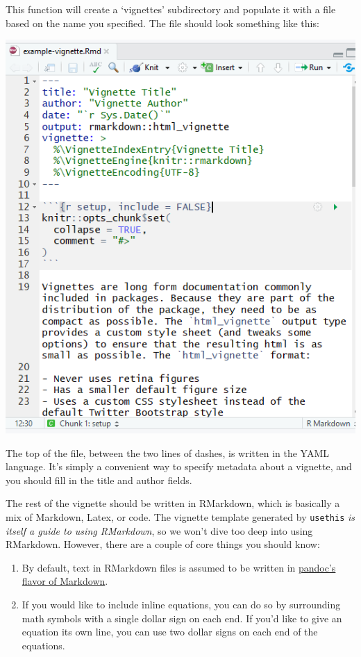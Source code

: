 \documentclass[
]{book}
\providecommand{\tightlist}{%
  \setlength{\itemsep}{0pt}\setlength{\parskip}{0pt}}
\begin{document}
This function will create a `vignettes' subdirectory and populate it with a file based on the name you specified. The file should look something like this:

\includegraphics{images/packageSS/vignette1.PNG}

The top of the file, between the two lines of dashes, is written in the YAML language. It's simply a convenient way to specify metadata about a vignette, and you should fill in the title and author fields.

The rest of the vignette should be written in RMarkdown, which is basically a mix of Markdown, Latex, or code. The vignette template generated by \texttt{usethis} \emph{is itself a guide to using RMarkdown}, so we won't dive too deep into using RMarkdown. However, there are a couple of core things you should know:

\begin{enumerate}
\def\labelenumi{\arabic{enumi}.}
\tightlist
\item
  By default, text in RMarkdown files is assumed to be written in \href{http://pandoc.org/MANUAL.html}{pandoc's flavor of Markdown}.
\item
  If you would like to include inline equations, you can do so by surrounding math symbols with a single dollar sign on each end. If you'd like to give an equation its own line, you can use two dollar signs on each end of the equations.
\end{enumerate}
\end{document}
